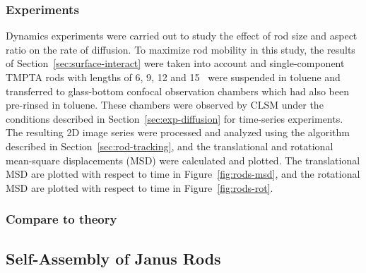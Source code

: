 
\subsubsection{Experiments}

Dynamics experiments were carried out to study the effect of rod size and aspect ratio on the rate of
diffusion.  To maximize rod mobility in this study, the results of Section~\ref{sec:surface-interact}
were taken into account and single-component TMPTA 
rods with lengths of 6, 9, 12 and 15 \microns~were suspended in toluene and transferred 
to glass-bottom confocal observation chambers which had 
also been
pre-rinsed in toluene.  These chambers were observed by CLSM under the conditions described in 
Section~\ref{sec:exp-diffusion} for time-series experiments.  The resulting 2D image series were 
processed and analyzed using the algorithm described in Section~\ref{sec:rod-tracking}, and 
the translational and rotational mean-square displacements (MSD) were calculated and plotted.
The translational MSD are plotted with respect to time in Figure~\ref{fig:rods-msd}, and the 
rotational MSD are plotted with respect to time in Figure~\ref{fig:rods-rot}.



\subsubsection{Compare to theory}

\subsection{Self-Assembly of Janus Rods}



